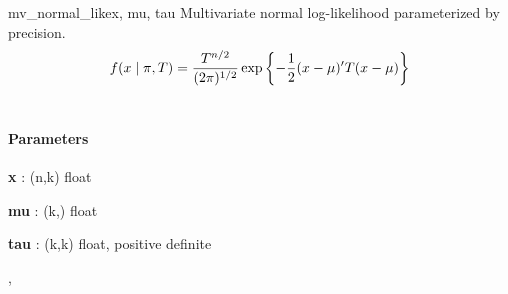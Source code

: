 \hypertarget{pymc.distributions.mv_normal_like}{}
\begin{funcdesc}{mv\_normal\_like}{x, mu, tau}
Multivariate normal log-likelihood parameterized by precision.
\begin{gather}
\begin{split}f(x \mid \pi, T) = \frac{T^{n/2}}{(2\pi)^{1/2}} \exp\left\{ -\frac{1}{2} (x-\mu)^{\prime}T(x-\mu) \right\}\end{split}\notag\\\begin{split}\end{split}\notag
\end{gather}\paragraph{Parameters}\begin{paramlist}

\item[] \textbf{x} : (n,k) float

\item[] \textbf{mu} : (k,) float

\item[] \textbf{tau} : (k,k) float, positive definite
\end{paramlist}



\hyperlink{pymc.distributions.mv_normal_chol_like}{}, \hyperlink{pymc.distributions.mv_normal_cov_like}{}


\end{funcdesc}


